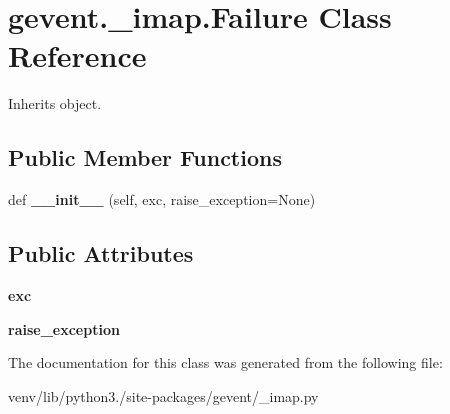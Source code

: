 \hypertarget{classgevent_1_1__imap_1_1_failure}{}\section{gevent.\+\_\+imap.\+Failure Class Reference}
\label{classgevent_1_1__imap_1_1_failure}


Inherits object.

\subsection*{Public Member Functions}
\begin{DoxyCompactItemize}
\item 
\mbox{\label{classgevent_1_1__imap_1_1_failure_a554fe4621fc4e0da7477878a4a740d27}} 
def {\bfseries \+\_\+\+\_\+init\+\_\+\+\_\+} (self, exc, raise\+\_\+exception=None)
\end{DoxyCompactItemize}
\subsection*{Public Attributes}
\begin{DoxyCompactItemize}
\item 
\mbox{\label{classgevent_1_1__imap_1_1_failure_a15dcd94b68821a0bfd0164fbf7cb9f73}} 
{\bfseries exc}
\item 
\mbox{\label{classgevent_1_1__imap_1_1_failure_a9b15a7a232fb26afa6f4fdcc64f76168}} 
{\bfseries raise\+\_\+exception}
\end{DoxyCompactItemize}


The documentation for this class was generated from the following file\+:\begin{DoxyCompactItemize}
\item 
venv/lib/python3./site-\/packages/gevent/\+\_\+imap.\+py\end{DoxyCompactItemize}
